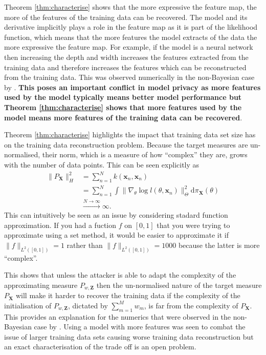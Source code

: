 \documentclass[hyperref]{article}
\theoremstyle{plain}
\theoremstyle{remark}
\newcommand{\bx}{\mathbf{x}}
\newcommand{\bX}{\mathbf{X}}
\newcommand{\bZ}{\mathbf{Z}}
\begin{document}
Theorem \ref{thm:characterise} shows that the more expressive the feature map, the more of the features of the training data can be recovered. The model and its derivative implicitly plays a role in the feature map as it is part of the likelihood function, which means that the more features the model extracts of the data the more expressive the feature map. For example, if the model is a neural network then increasing the depth and width increases the features extracted from the training data and therefore increases the features which can be reconstructed from the training data. This was observed numerically in the non-Bayesian case by  \citet{Haim2022,Loo2023}. \textbf{This poses an important conflict in model privacy as more features used by the model typically means better model performance but Theorem \ref{thm:characterise} shows that more features used by the model means more features of the training data can be recovered}. 

Theorem \ref{thm:characterise} highlights the impact that training data set size has on the training data reconstruction problem. Because the target measures are un-normalised, their norm, which is a measure of how ``complex'' they are, grows with the number of data points.  This can be seen explicitly as 
\begin{align*}\lVert P_{\bX}\rVert_{H}^{2} & = \sum_{n=1}^{N}k(\bx_{n},\bx_{n}) \\
	& = \sum_{n=1}^{N}\int \lVert \nabla_{\theta}\log l(\theta,\bx_{n})\rVert_{\Theta}^{2}\mathrm{d}\pi_{\bX}(\theta)\\
	& \xrightarrow{N\rightarrow\infty}\infty.
\end{align*}
This can intuitively be seen as an issue by considering stadard function approximation. If you had a fuction $f$ on $[0,1]$ that you were trying to approximate using a set method, it would be easier to approximate it if $\lVert f\rVert_{L^{2}([0,1])} = 1$ rather than $\lVert f\rVert_{L^{2}([0,1])} = 1000$ because the latter is more ``complex''.

This shows that unless the attacker is able to adapt the complexity of the approximating measure $P_{w,\bZ}$ then the un-normalised nature of the target measure $P_{\bX}$ will make it harder to recover the training data if the complexity of the initialisation of $P_{w,\bZ}$, dictated by $\sum_{m=1}^{M}w_{m}$, is far from the complexity of $P_{\bX}$. This provides an explanation for the numerics that were observed in the non-Bayesian case by \citet{Haim2022,Loo2023}. Using a model with more features was seen to combat the issue of larger training data sets causing worse training data reconstruction but an exact characterisation of the trade off is an open problem. 
\end{document}
